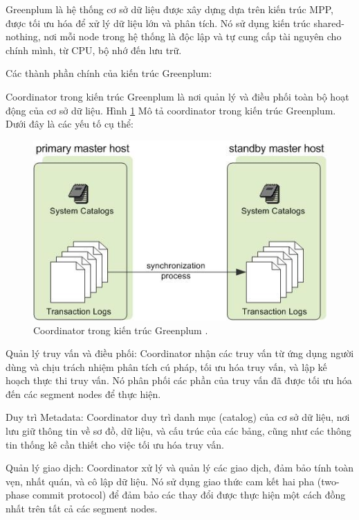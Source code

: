\documentclass{article}[14pt]
\begin{document}
{{Greenplum là hệ thống cơ sở dữ liệu được xây dựng dựa trên kiến
trúc MPP, được tối ưu hóa để xử lý dữ liệu lớn và phân tích. Nó sử dụng kiến
trúc shared-nothing, nơi mỗi node trong hệ thống là độc lập và tự cung cấp tài nguyên cho chính mình, từ CPU, bộ nhớ đến lưu trữ.

Các thành phần chính của kiến trúc Greenplum:

Coordinator trong kiến trúc Greenplum là nơi quản lý và điều phối
toàn bộ hoạt động của cơ sở dữ liệu. Hình \ref{fig:admin_guide-graphics-standby_coordinator} Mô tả coordinator trong kiến trúc Greenplum.
Dưới đây là các yếu tố cụ thể:


\begin{figure}[htbp]
\centerline{\includegraphics[scale=.7]{images/admin_guide-graphics-standby_coordinator.jpg}}
\captionsetup{font=Large}
\caption{Coordinator trong kiến trúc Greenplum \cite{vmware_greenplum}.}
\label{fig:admin_guide-graphics-standby_coordinator}
\end{figure}

Quản lý truy vấn và điều phối: Coordinator nhận các truy vấn từ ứng dụng người dùng và chịu trách nhiệm phân tích cú pháp, tối ưu hóa truy vấn, và lập kế hoạch thực thi truy vấn. Nó phân phối các phần của truy vấn đã được tối ưu hóa đến các segment nodes để thực hiện.


Duy trì Metadata: Coordinator duy trì danh mục (catalog) của cơ sở dữ liệu, nơi lưu giữ thông tin về sơ đồ, dữ liệu, và cấu trúc của các bảng, cũng như các thông tin thống kê cần thiết cho việc tối ưu hóa truy vấn.

Quản lý giao dịch: Coordinator xử lý và quản lý các giao dịch, đảm bảo tính toàn vẹn, nhất quán, và cô lập dữ liệu. Nó sử dụng giao thức cam kết hai pha (two-phase commit protocol) để đảm bảo các thay đổi được thực hiện một cách đồng nhất trên tất cả các segment nodes.

}}
\end{document}

